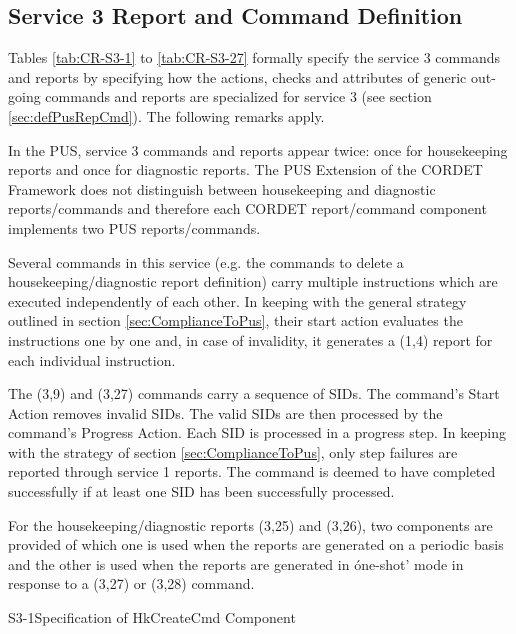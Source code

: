 \documentclass{pnp_article}
\begin{document}
\subsection{Service 3 Report and Command Definition}\label{sec:serv3RepCmdDef}
Tables \ref{tab:CR-S3-1} to \ref{tab:CR-S3-27} formally specify the service 3 commands and reports by specifying how the actions, checks and attributes of generic out-going commands and reports are specialized for service 3 (see section \ref{sec:defPusRepCmd}). The following remarks apply.

\begin{fw_itemize}
\item In the PUS, service 3 commands and reports appear twice: once for housekeeping reports and once for diagnostic reports. The PUS Extension of the CORDET Framework does not distinguish between housekeeping and diagnostic reports/commands and therefore each CORDET report/command component implements two PUS reports/commands.
\item Several commands in this service (e.g. the commands to delete a housekeeping/diagnostic report definition) carry multiple instructions which are executed independently of each other. In keeping with the general strategy outlined in section \ref{sec:ComplianceToPus}, their start action evaluates the instructions one by one and, in case of invalidity, it generates a (1,4) report for each individual instruction.
\item The (3,9) and (3,27) commands carry a sequence of SIDs. The command's Start Action removes invalid SIDs. The valid SIDs are then processed by the command's Progress Action. Each SID is processed in a progress step. In keeping with the strategy of section \ref{sec:ComplianceToPus}, only step failures are reported through service 1 reports. The command is deemed to have completed successfully if at least one SID has been successfully processed. 
\item For the housekeeping/diagnostic reports (3,25) and (3,26), two components are provided of which one is used when the reports are generated on a periodic basis and the other is used when the reports are generated in óne-shot' mode in response to a (3,27) or (3,28) command.
\end{fw_itemize}


\begin{cr_cmd}{S3-1}{Specification of HkCreateCmd Component}
\end{cr_cmd}
\end{document}
